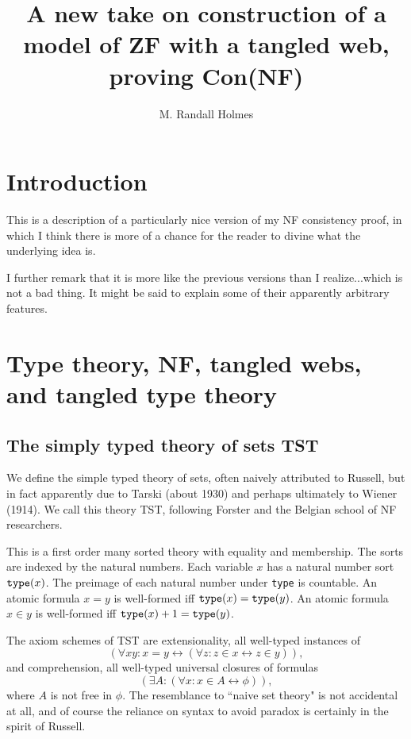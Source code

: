 \documentclass[12pt]{article}
\title{A new take on construction of a model of ZF with a tangled web, proving Con(NF)}
\author{M. Randall Holmes}
\begin{document}
\maketitle

\section{Introduction}

This is a description of a particularly nice version of my NF consistency proof, in which I think there is more of a chance for the reader to divine what the underlying idea is.

I further remark that it is more like the previous versions than I realize...which is not a bad thing.  It might be said to explain some of their apparently arbitrary features.

\newpage

\section{Type theory, NF, tangled webs, and tangled type theory}

\subsection{The simply typed theory of sets TST}

We define the simple typed theory of sets, often naively attributed to Russell, but in fact apparently due to Tarski (about 1930) and perhaps ultimately to Wiener (1914).  We call this theory TST, following Forster and the Belgian school of NF researchers.

This is a first order many sorted theory with equality and membership.  The sorts are indexed by the natural numbers.  Each variable $x$ has  a natural number sort
${\tt type}(x)$. The preimage of each natural number under {\tt type} is countable.   An atomic formula $x=y$ is well-formed iff ${\tt type}(x)={\tt type}(y)$.  An atomic formula $x \in y$ is well-formed iff ${\tt type}(x)+1 = {\tt type}(y)$.

The axiom schemes of TST are extensionality, all well-typed instances of $$(\forall xy:x=y \leftrightarrow (\forall z:z \in x \leftrightarrow z \in y)),$$ and comprehension, all well-typed universal closures of formulas
$$(\exists A:(\forall x:x \in A \leftrightarrow \phi)),$$  where $A$ is not free in $\phi$.  The resemblance to ``naive set theory" is not accidental at all, and of course the reliance on syntax to avoid paradox is certainly in the spirit of Russell.
\end{document}
